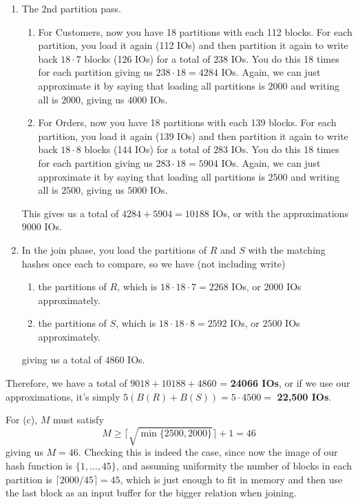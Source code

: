\begin{example}
\begin{enumerate}
      \item The 2nd partition pass. 
        \begin{enumerate}
          \item For Customers, now you have 18 partitions with each 112 blocks. For each partition, you load it again (112 IOs) and then partition it again to write back $18 \cdot 7$ blocks (126 IOs) for a total of $238$ IOs. You do this 18 times for each partition giving us $238 \cdot 18 = 4284$ IOs. Again, we can just approximate it by saying that loading all partitions is $2000$ and writing all is $2000$, giving us $4000$ IOs. 
          \item For Orders, now you have 18 partitions with each 139 blocks. For each partition, you load it again (139 IOs) and then partition it again to write back $18 \cdot 8$ blocks (144 IOs) for a total of $283$ IOs. You do this 18 times for each partition giving us $283 \cdot 18 = 5904$ IOs. Again, we can just approximate it by saying that loading all partitions is $2500$  and writing all is $2500$, giving us $5000$ IOs. 
        \end{enumerate}
        This gives us a total of $4284 + 5904 = 10188$ IOs, or with the approximations $9000$ IOs. 

      \item In the join phase, you load the partitions of $R$ and $S$ with the matching hashes once each to compare, so we have (not including write)  
        \begin{enumerate}
          \item the partitions of $R$, which is $18 \cdot 18 \cdot 7 = 2268$ IOs, or $2000$ IOs approximately.  
          \item the partitions of $S$, which is $18 \cdot 18 \cdot 8 = 2592$ IOs, or $2500$ IOs approximately.  
        \end{enumerate}
        giving us a total of $4860$ IOs. 
    \end{enumerate}
    Therefore, we have a total of $9018 + 10188 + 4860$ = \textbf{24066 IOs}, or if we use our approximations, it's simply $5 (B(R) + B(S)) = 5 \cdot 4500 =$ \textbf{22,500 IOs}. 

    For (c), $M$ must satisfy 
    \begin{equation}
      M \geq \lceil \sqrt{\min\{2500, 2000\}} \rceil + 1 = 46
    \end{equation} 
    giving us $M = 46$. Checking this is indeed the case, since now the image of our hash function is $\{1, \ldots, 45\}$, and assuming uniformity the number of blocks in each partition is $\lceil 2000 / 45 \rceil = 45$, which is just enough to fit in memory and then use the last block as an input buffer for the bigger relation when joining. 
  \end{example}


